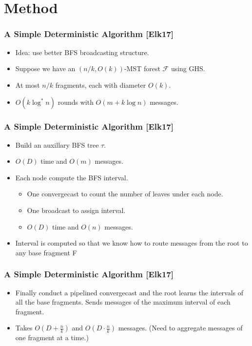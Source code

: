 \section{Method}

\begin{frame}
\frametitle{A Simple Deterministic Algorithm [Elk17]}
\begin{itemize}
    \item Idea: use better BFS broadcasting structure.
    \item Suppose we have an $(n/k,O(k))$-MST forest $\mathcal{F}$ using GHS. 
    \item At most $n/k$ fragments, each with diameter $O(k)$.
    \item $O(k \log^*n)$ rounds with $O(m + k \log n)$ messages.
\end{itemize}
\end{frame}


\begin{frame}
\frametitle{A Simple Deterministic Algorithm [Elk17]}
\begin{itemize}
    \item Build an auxillary BFS tree $\tau$.
    \item $O(D)$ time and $O(m)$ messages.
    \item Each node compute the BFS interval.
    \begin{itemize}
        \item One convergecast to count the number of leaves under each node.
        \item One broadcast to assign interval.
        \item $O(D)$ time and $O(n)$ messages.
    \end{itemize}
    \item Interval is computed so that we know how to route messages from the root to any base fragment F
\end{itemize}
\end{frame}

\begin{frame}
\frametitle{A Simple Deterministic Algorithm [Elk17]}
\begin{itemize}
    \item Finally conduct a pipelined convergecast and the root learns the intervals of all the base fragments. Sends messages of the maximum interval of each fragment.
    \item Takes $O(D+\frac{n}{k})$ and $O(D \cdot \frac{n}{k})$ messages. (Need to aggregate messages of one fragment at a time.)
\end{itemize}
\end{frame}

